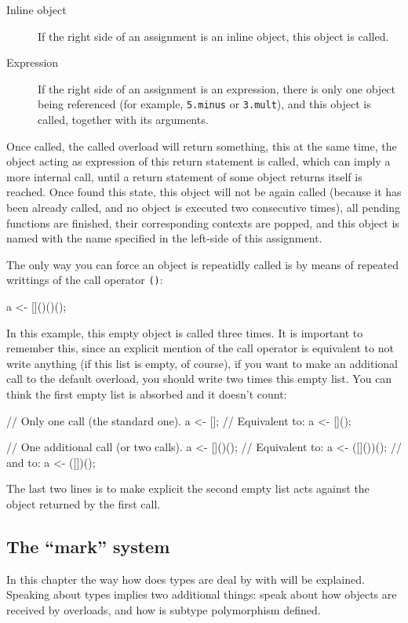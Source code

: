 \documentclass{article}
\begin{document}
\begin{description}
  \item[Inline object] If the right side of an assignment is an inline object,
    this object is called.
  \item[Expression] If the right side of an assignment is an expression, there
    is only one object being referenced (for example, \texttt{5.minus} or
    \texttt{3.mult}), and this object is called, together with its arguments.
\end{description}

Once called, the called overload will return something, this at the same time,
the object acting as expression of this return statement is called, which can
imply a more internal call, until a return statement of some object returns
itself is reached. Once found this state, this object will not be again called
(because it has been already called, and no object is executed two consecutive
times), all pending functions are finished, their corresponding contexts are
popped, and this object is named with the name specified in the left-side of
this assignment.

The only way you can force an object is repeatidly called is by means of
repeated writtings of the call operator \texttt{()}:

\begin{faupp2}
  a <- []()()();
\end{faupp2}

In this example, this empty object is called three times. It is important to
remember this, since an explicit mention of the call operator is equivalent to
not write anything (if this list is empty, of course), if you want to make an
additional call to the default overload, you should write two times this empty
list. You can think the first empty list is absorbed and it doesn't count:

\begin{faupp2}
  // Only one call (the standard one).
  a <- []; // Equivalent to:
  a <- []();

  // One additional call (or two calls).
  a <- []()(); // Equivalent to:
  a <- ([]())(); // and to:
  a <- ([])();
\end{faupp2}

The last two lines is to make explicit the second empty list acts against the
object returned by the first call.

\subsection{The ``mark'' system}
\label{ssec:marks}
In this chapter the way how does types are deal by \faupp with will be
explained. Speaking about types implies two additional things: speak about how
objects are received by overloads, and how is subtype polymorphism defined.
\end{document}
